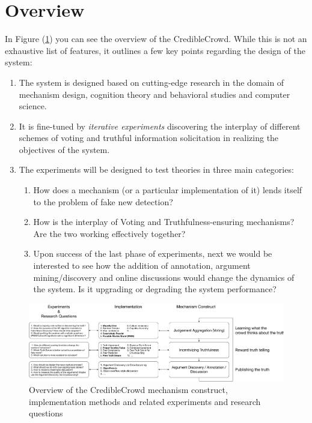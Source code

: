 \documentclass{report}
\theoremstyle{definition}
\begin{document}
\section{Overview}
In Figure (\ref{fig:overview}) you can see the overview of the CredibleCrowd. While this is not an exhaustive list of features, it outlines a few key points regarding the design of the system:
\begin{enumerate}
    \item The system is designed based on cutting-edge research in the domain of mechanism design, cognition theory and behavioral studies and computer science. 
    \item It is fine-tuned by \emph{iterative experiments} discovering the interplay of different schemes of voting and truthful information solicitation in realizing the objectives of the system.
    \item The experiments will be designed to test theories in three main categories:
        \begin{enumerate}
            \item How does a mechanism (or a particular implementation of it) lends itself to the problem of fake new detection?
            \item How is the interplay of Voting and Truthfulness-ensuring mechanisms? Are the two working effectively together?
            \item Upon success of the last phase of experiments, next we would be interested to see how the addition of annotation, argument mining/discovery and online discussions would change the dynamics of the system. Is it upgrading or degrading the system performance?
        \end{enumerate}
\end{enumerate}

\begin{landscape}
\begin{figure}
    \centering
    \includegraphics[width=1.8\textwidth]{fake_news_diagram.pdf}
    \caption{Overview of the CredibleCrowd mechanism construct, implementation methods and related experiments and research questions}
    \label{fig:overview}
\end{figure}
\end{landscape}
\end{document}
